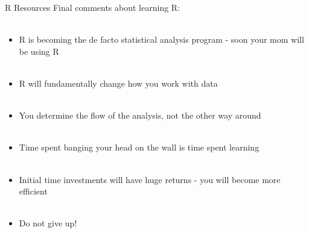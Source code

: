 \documentclass[xcolor=svgnames]{beamer}\usepackage[]{graphicx}\usepackage[]{color}
\begin{document}
\begin{frame}[t]{R Resources}
Final comments about learning R:\\~\\
\begin{itemize}
\item R is becoming the de facto statistical analysis program - soon your mom will be using R \\~\\
\item R will fundamentally change how you work with data \\~\\
\item You determine the flow of the analysis, not the other way around \\~\\
\item Time spent banging your head on the wall is time spent learning \\~\\
\item Initial time investments will have huge returns - you will become more efficient \\~\\
\item Do not give up!
\end{itemize}
\end{frame}
\end{document}
